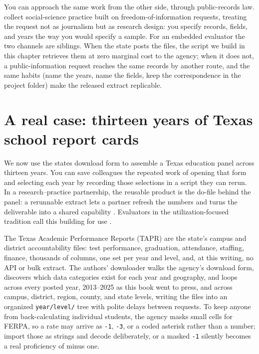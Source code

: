 \documentclass[
    a4paper,
    fontsize=10pt,
    twoside=true,
    numbers=noenddot,
]{kaobook}
\begin{document}
You can approach the same work from the other side, through public-records law. \textcite{walby2019foi} collect social-science practice built on freedom-of-information requests, treating the request not as journalism but as research design: you specify records, fields, and years the way you would specify a sample. For an embedded evaluator the two channels are siblings. When the state posts the files, the script we build in this chapter retrieves them at zero marginal cost to the agency; when it does not, a public-information request reaches the same records by another route, and the same habits (name the years, name the fields, keep the correspondence in the project folder) make the released extract replicable.

\section{A real case: thirteen years of Texas school report cards}
We now use the state\textquotesingle s download form to assemble a Texas education panel across thirteen years. You can save colleagues the repeated work of opening that form and selecting each year by recording those selections in a script they can rerun. In a research--practice partnership, the reusable product is the do-file behind the panel: a rerunnable extract lets a partner refresh the numbers and turns the deliverable into a shared capability \parencite{coburn2016partnerships}. Evaluators in the utilization-focused tradition call this building for use \parencite{patton2008utilization}.

The Texas Academic Performance Reports (TAPR) are the state's campus and district accountability files: test performance, graduation, attendance, staffing, finance, thousands of columns, one set per year and level, and, at this writing, no API or bulk extract. The authors' downloader walks the agency's download form, discovers which data categories exist for each year and geography, and loops across every posted year, 2013--2025 as this book went to press, and across campus, district, region, county, and state levels, writing the files into an organized \texttt{year/level/} tree with polite delays between requests. To keep anyone from back-calculating individual students, the agency masks small cells for FERPA, so a rate may arrive as \texttt{-1}, \texttt{-3}, or a coded asterisk rather than a number; import those as strings and decode deliberately, or a masked \texttt{-1} silently becomes a real proficiency of minus one.
\end{document}
